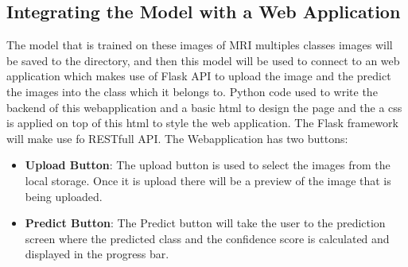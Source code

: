 \documentclass[12pt,onecolumn]{report}
\begin{document}
\subsection{Integrating the Model with a Web Application}
The model that is trained on these images of MRI multiples classes images will be saved to the directory, and then this model will be used to connect to an web application which makes use of Flask API to upload the image and the predict the images into the class which it belongs to. Python code used to write the backend of this webapplication and a basic html to design the page and the a css is applied on top of this html to style the web application. The Flask framework will make use fo RESTfull API. The Webapplication has two buttons:
\begin{itemize}
    \item \textbf{Upload Button}: The upload button is used to select the images from the local storage. Once it is upload there will be a preview of the image that is being uploaded.
    \item \textbf{Predict Button}: The Predict button will take the user to the prediction screen where the predicted class and the confidence score is calculated and displayed in the progress bar.
\end{itemize}
\end{document}
